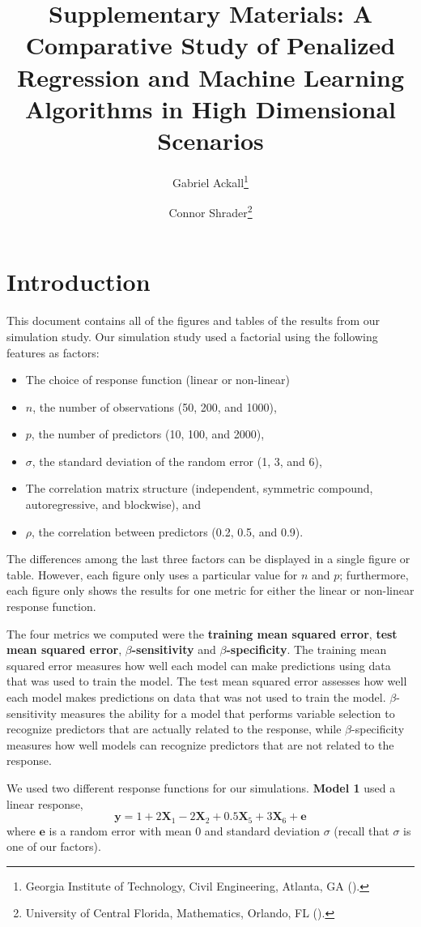 \documentclass[final,supplement,onefignum,onetabnum]{siuro210301}
\title{Supplementary Materials: A Comparative Study of Penalized Regression and Machine Learning Algorithms in High Dimensional Scenarios}
\author{Gabriel Ackall\thanks{Georgia Institute of Technology, Civil Engineering, Atlanta, GA
		(\email{gackall@gatech.edu}).}
	\and Connor Shrader\thanks{University of Central  Florida, Mathematics, Orlando, FL
		(\email{connorshrader@knights.ucf.edu}).}}
\begin{document}
	\maketitle
	\section{Introduction}
	
	This document contains all of the figures and tables of the results from our simulation study. Our simulation study used a factorial using the following features as factors:
	\begin{itemize}
		\item The choice of response function (linear or non-linear)
		\item $n$, the number of observations (50, 200, and 1000),
		\item $p$, the number of predictors (10, 100, and 2000),
		\item $\sigma$, the standard deviation of the random error (1, 3, and 6),
		\item The correlation matrix structure (independent, symmetric compound, autoregressive, and blockwise), and
		\item $\rho$, the correlation between predictors (0.2, 0.5, and 0.9).
	\end{itemize}
	The differences among the last three factors can be displayed in a single figure or table. However, each figure only uses a particular value for $n$ and $p$; furthermore, each figure only shows the results for one metric for either the linear or non-linear response function.
	
	The four metrics we computed were the \textbf{training mean squared error}, \textbf{test mean squared error}, \textbf{$\beta$-sensitivity} and \textbf{$\beta$-specificity}. The training mean squared error measures how well each model can make predictions using data that was used to train the model. The test mean squared error assesses how well each model makes predictions on data that was not used to train the model. $\beta$-sensitivity measures the ability for a model that performs variable selection to recognize predictors that are actually related to the response, while $\beta$-specificity measures how well models can recognize predictors that are not related to the response.
	
	We used two different response functions for our simulations. \textbf{Model 1} used a linear response,
	\begin{equation}\label{eqn:linear-response}
		\mathbf{y} = 1 + 2\mathbf{X}_1 - 2\mathbf{X}_2 + 0.5\mathbf{X}_5 + 3\mathbf{X}_6 + \mathbf{e}
	\end{equation}
	where $\mathbf{e}$ is a random error with mean 0 and standard deviation $\sigma$ (recall that $\sigma$ is one of our factors).
	
\end{document}

